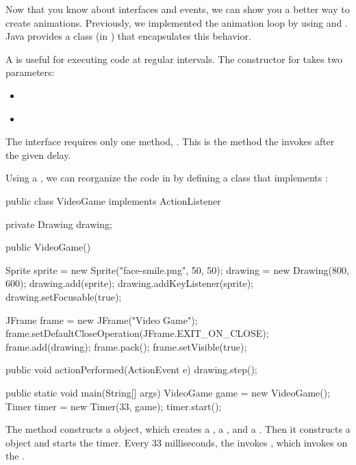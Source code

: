 
Now that you know about interfaces and events, we can show you a better way to create animations.
Previously, we implemented the animation loop by using  and .
Java provides a  class (in ) that encapsulates this behavior.

A  is useful for executing code at regular intervals.
The constructor for  takes two parameters:

\begin{itemize}
\item {} {\tt ~~~~~~~~~~~~~~~} 

\item {} {\tt ~} 
\end{itemize}

The  interface requires only one method, .
This is the method the  invokes after the given delay.

Using a , we can reorganize the code in  by defining a class that implements :

\begin{code}
public class VideoGame implements ActionListener {
    private Drawing drawing;

    public VideoGame() {
        Sprite sprite = new Sprite("face-smile.png", 50, 50);
        drawing = new Drawing(800, 600);
        drawing.add(sprite);
        drawing.addKeyListener(sprite);
        drawing.setFocusable(true);

        JFrame frame = new JFrame("Video Game");
        frame.setDefaultCloseOperation(JFrame.EXIT_ON_CLOSE);
        frame.add(drawing);
        frame.pack();
        frame.setVisible(true);
    }

    public void actionPerformed(ActionEvent e) {
        drawing.step();
    }

    public static void main(String[] args) {
        VideoGame game = new VideoGame();
        Timer timer = new Timer(33, game);
        timer.start();
    }
}
\end{code}

The  method constructs a  object, which creates a , a , and a .
Then it constructs a  object and starts the timer.
Every 33 milliseconds, the  invokes , which invokes  on the .

